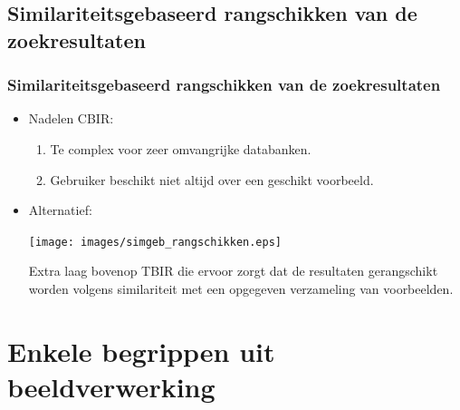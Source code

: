 \documentclass[dutch]{beamer}
\theoremstyle{definition}
\theoremstyle{remark}
\theoremstyle{example}
\begin{document}
\subsection{Similariteitsgebaseerd rangschikken van de zoekresultaten}
\frame
{
  \frametitle{Similariteitsgebaseerd rangschikken van de zoekresultaten}
  
  \begin{itemize}
  \item Nadelen CBIR:
  \begin{enumerate}
    \item Te complex voor zeer omvangrijke databanken.
    \item Gebruiker beschikt niet altijd over een geschikt voorbeeld.
  \end{enumerate}

  \item Alternatief:
  \begin{center}
  \texttt{[image: images/simgeb\_rangschikken.eps]}
  \end{center}
  Extra laag bovenop TBIR die ervoor zorgt dat de resultaten gerangschikt
  worden volgens similariteit met een opgegeven verzameling van voorbeelden.
  \end{itemize}
}

\section{Enkele begrippen uit beeldverwerking}
\end{document}
